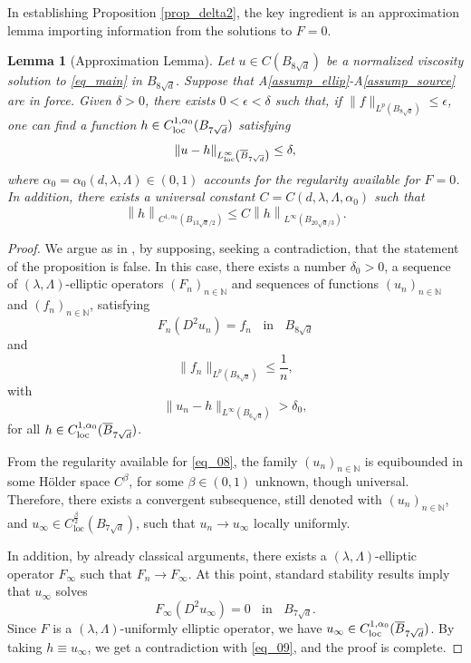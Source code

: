 \documentclass[10pt]{article} %
\newtheorem{Lemma}{Lemma}
\begin{document}
In establishing Proposition \ref{prop_delta2}, the key ingredient is an approximation lemma importing information from the solutions to $F=0$.

\begin{Lemma}[Approximation Lemma]\label{lem_7.9}
 Let $u \in   C (B_{8\sqrt{d}})$ be a normalized viscosity solution to \eqref{eq_main} in $B_{8\sqrt{d}}$. Suppose that A\ref{assump_ellip}-A\ref{assump_source} are in force. Given $\delta >0$, there exists $0< \epsilon < \delta$ such that, if $\|f\|_{L^p(B_{8\sqrt{d}})} \leq \epsilon$, one can find a function $h \in  C _{{\rm loc}}^{1,\alpha_0}(B_{7\sqrt{d}})$ satisfying
\[
\|u-h\|_{L^\infty_{{\rm loc}}\left(\overline{B}_{7\sqrt{d}}\right)}  \leq  \delta,
\]
where $\alpha_0 =\alpha_0(d,\lambda, \Lambda)\in(0,1)$ accounts for the regularity available for $F=0$. In addition, there exists a universal constant $C=C(d, \lambda, \Lambda, \alpha_0)$ such that
\[
	\left\|h\right\|_{ C ^{1,\alpha_0}(B_{13\sqrt{d}/2})} \leq C\left\|h\right\|_{L^\infty(B_{20\sqrt{d}/3})}.
\]
\end{Lemma}
\begin{proof}
We argue  as in \cite{M5}, by supposing, seeking a contradiction, that the statement of the proposition is false. In this case, there exists a number $\delta_0>0$, a sequence of $(\lambda,\Lambda)$-elliptic operators $(F_n)_{n\in\mathbb{N}}$ and sequences of functions $(u_n)_{n\in\mathbb{N}}$ and $(f_n)_{n\in\mathbb{N}}$, satisfying
\begin{equation}\label{eq_08}
	F_n(D^2u_n) = f_n \;\;\text{ in } \;\; B_{8\sqrt{d}}
\end{equation}
and
\[
\|f_n\|_{L^p(B_{8\sqrt{d}})} \leq \frac{1}{n},
\]
with
\begin{equation}\label{eq_09}
\|u_n - h\|_{L^{\infty}(B_{6\sqrt{d}})} > \delta_0,
\end{equation}
for all $h \in  C ^{1,\alpha_0}_{{\rm loc}}(\overline{B}_{7\sqrt{d}})$.

From the regularity available for \eqref{eq_08}, the family $(u_n)_{n\in\mathbb{N}}$ is equibounded in some H\"older space $ C ^\beta$, for some $\beta\in(0,1)$ unknown, though universal. Therefore, there exists a convergent subsequence, still denoted with $(u_n)_{n\in\mathbb{N}}$, and $u_\infty \in  C ^{\frac{\beta}{2}}_{\text{loc}}(B_{7\sqrt{d}})$, such that $u_n\to u_\infty$ locally uniformly.

In addition, by already classical arguments, there exists a $(\lambda,\Lambda)$-elliptic operator $F_\infty$ such that $F_n\to F_\infty$. At this point, standard stability results \cite[Theorem 3.8]{CCKS} imply that $u_\infty$ solves
\[
F_\infty(D^2u_\infty) = 0 \;\;\text{ in }\;\; B_{7\sqrt{d}}.
\]
Since $F$ is a $(\lambda,\Lambda)$-uniformly elliptic operator, we have  $u_\infty  \in  C ^{1,\alpha_0}_{{\rm loc}}(\overline{B}_{7\sqrt{d}})$. By taking $h\equiv u_\infty$, we get a contradiction with \eqref{eq_09}, and the proof is complete.
\end{proof}
\end{document}

